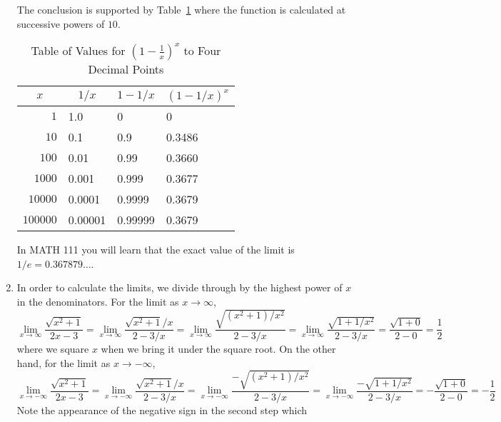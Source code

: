 \documentclass{article}
\begin{document}
\begin{enumerate}
  The conclusion is supported by Table~\ref{tab:exp} where the
  function is calculated at successive powers of $10$.
  \begin{table}[htbp]
    \begin{center}
      \begin{tabular}{|r|l|l|l|}
        \hline
        \multicolumn{1}{|c|}{$x$}     
	         & \multicolumn{1}{|c|}{$1/x$}
		           & \multicolumn{1}{|c|}{$1-1/x$} 
			             & \multicolumn{1}{|c|}{$(1-1/x)^x$} \\
	\hline\hline
	$1$      & 1.0     & 0       & 0      \\
	\hline
	$10$     & 0.1     & 0.9     & 0.3486 \\
	\hline
	$100$    & 0.01    & 0.99    & 0.3660 \\
	\hline
	$1000$   & 0.001   & 0.999   & 0.3677 \\
	\hline
	$10000$  & 0.0001  & 0.9999  & 0.3679 \\
	\hline
	$100000$ & 0.00001 & 0.99999 & 0.3679 \\
	\hline
      \end{tabular}
    \end{center}
    \caption{Table of Values for $\left(1-\frac{1}{x}\right)^x$ to Four
      Decimal Points}
    \label{tab:exp}
  \end{table}
  In MATH 111 you will learn that the exact value of the limit is
  $1/e = 0.367879\ldots$.
\item %
  In\label{prob:sqrtlim} order to calculate the limits, we divide
  through by the highest power of $x$ in the denominators.  For the
  limit as $x\to\infty$,
  \begin{displaymath}
    \lim_{x\to\infty} \frac{\sqrt{x^2+1}}{2x-3}
    = \lim_{x\to\infty} \frac{\sqrt{x^2+1}/x}{2-3/x}
    = \lim_{x\to\infty} \frac{\sqrt{(x^2+1)/x^2}}{2-3/x}
    = \lim_{x\to\infty} \frac{\sqrt{1+1/x^2}}{2-3/x}
    = \frac{\sqrt{1+0}}{2-0} = \frac{1}{2}
  \end{displaymath}
  where we square $x$ when we bring it under the square root.  On
  the other hand, for the limit as $x\to -\infty$,
  \begin{displaymath}
    \lim_{x\to -\infty} \frac{\sqrt{x^2+1}}{2x-3}
    = \lim_{x\to -\infty} \frac{\sqrt{x^2+1}/x}{2-3/x}
    = \lim_{x\to -\infty} \frac{-\sqrt{(x^2+1)/x^2}}{2-3/x}
    = \lim_{x\to -\infty} \frac{-\sqrt{1+1/x^2}}{2-3/x}
    = -\frac{\sqrt{1+0}}{2-0} = -\frac{1}{2}
  \end{displaymath}
  Note the appearance of the negative sign in the second step which

\end{enumerate}
\end{document}
